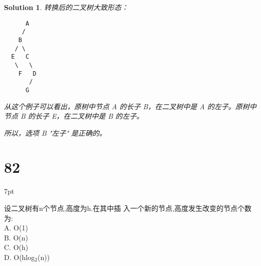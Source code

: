 \documentclass[UTF8]{report}
\newtheorem{solution}{Solution}
\theoremstyle{MyLineTheoremStyle} %
\theoremstyle{MyBlockTheoremStyle} %
\theoremstyle{MySubsubsectionStyle} %
\newenvironment{graybox}{%
        \def\FrameCommand{%
        \hspace{1pt}%
        {\color{gray}\small \vrule width 2pt}%
        {\color{graybox_color}\vrule width 4pt}%
        \colorbox{graybox_color}%
        }%
        \MakeFramed{\advance\hsize-\width\FrameRestore}%
        \noindent\hspace{-4.55pt}%
        \begin{adjustwidth}{}{7pt}%
        \vspace{2pt}\vspace{2pt}%
        }
        {%
        \vspace{2pt}\end{adjustwidth}\endMakeFramed%
        }
\begin{document}
\begin{solution}
转换后的二叉树大致形态：
\begin{verbatim}
      A
     /
    B
   / \
  E   C
   \   \
    F   D
       /
      G
\end{verbatim}

从这个例子可以看出，原树中节点 A 的长子 B，在二叉树中是 A 的左子。原树中节点 B 的长子 E，在二叉树中是 B 的左子。

所以，选项 B "左子" 是正确的。
\end{solution}



\section*{82}
\begin{graybox}
设二叉树有n个节点,高度为h.在其中插
入一个新的节点,高度发生改变的节点个数为: \\
A. O(1) \\
B. O(n) \\
C. O(h) \\
D. O(hlog$_{2}$(n))
\end{graybox}
\end{document}
